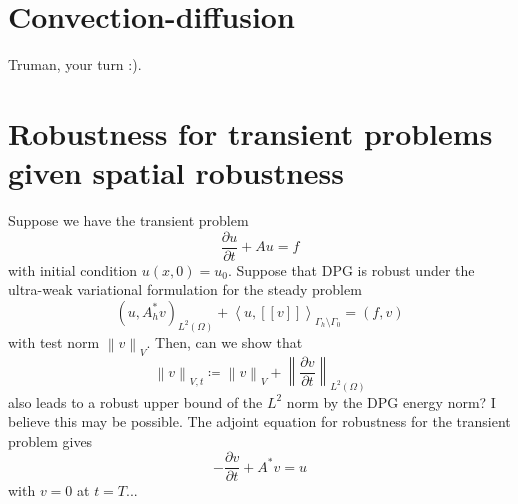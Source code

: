 \documentclass{article}
\newcommand{\pd}[2]{\frac{\partial#1}{\partial#2}}
\newcommand{\nor}[1]{\left\| #1 \right\|}
\newcommand{\LRp}[1]{\left( #1 \right)}
\newcommand{\LRs}[1]{\left[ #1 \right]}
\newcommand{\LRa}[1]{\left\langle #1 \right\rangle}
\newcommand{\jump}[1] {\ensuremath{\LRs{\![#1]\!}}}
\newcommand{\uh}{\widehat{u}}
\renewcommand{\L}{L^2\LRp{\Omega}}
\begin{document}
\section{Convection-diffusion}

Truman, your turn :).

\section{Robustness for transient problems given spatial robustness}

Suppose we have the transient problem
\[
\pd{u}{t} + Au = f
\]
with initial condition $u(x,0) = u_0$.  Suppose that DPG is robust under the ultra-weak variational formulation for the steady problem
\[
\LRp{u,A^*_h v}_{\L} + \LRa{\uh, \jump{v}}_{\Gamma_h\setminus \Gamma_0} = \LRp{f,v}
\]
with test norm $\nor{v}_{V}$.  Then, can we show that 
\[
\nor{v}_{V,t} \coloneqq \nor{v}_V + \nor{\pd{v}{t}}_{\L}
\]
also leads to a robust upper bound of the $L^2$ norm by the DPG energy norm?  I believe this may be possible.  The adjoint equation for robustness for the transient problem gives
\[
-\pd{v}{t} + A^*v = u
\]
with $v = 0$ at $t=T$...  
\end{document}
